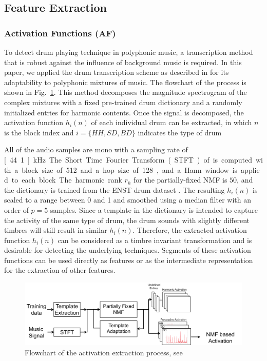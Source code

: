 \documentclass{article}
\begin{document}
\subsection{Feature Extraction}\label{ssec:featuresExtract}
\subsubsection{Activation Functions (AF)}
\label{sssec:activ}

To detect drum playing technique in polyphonic music, a transcription method that is robust against the influence of background music is required. In this paper, we applied the drum transcription scheme as described in \cite{Wu2015a} for its adaptability to polyphonic mixtures of music. The flowchart of the process is shown in Fig.~\ref{fig:nmf}. This method decomposes the magnitude spectrogram of the complex mixtures with a fixed pre-trained drum dictionary and a randomly initialized entries for harmonic contents. Once the signal is decomposed, the activation function $h_{i}(n)$ of each individual drum can be extracted, in which $n$ is the block index and $i = \{HH, SD, BD\}$ indicates the type of drum

All of the audio samples are mono with a sampling rate of \unit[44.1]{kHz}. The Short Time Fourier Transform (STFT) of is computed with a block size of 512 and a hop size of 128, and a Hann window is applied to each block. The harmonic rank $r_{h} $ for the partially-fixed NMF is  $50$, and the dictionary is trained from the ENST drum dataset \cite{Gillet2006}. The resulting $h_{i}(n)$ is scaled to a range between 0 and 1 and smoothed using a median filter with an order of $p = 5$ samples. Since a template in the dictionary is intended to capture the activity of the same type of drum, the drum sounds with slightly different timbres will still result in similar $h_{i}(n)$. Therefore, the extracted activation function $h_{i}(n)$ can be considered as a timbre invariant transformation and is desirable for detecting the underlying techniques. Segments of these activation functions can be used directly as features or as the intermediate representation for the extraction of other features. 

\begin{figure}
\centering
\includegraphics[width = 8.5 cm]{./figures/nmf.png}
\caption{Flowchart of the activation extraction process, see \cite{Wu2015a}}
\label{fig:nmf}
\end{figure}
\end{document}
